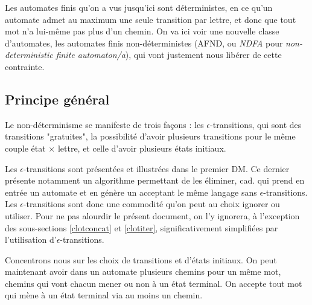 Les automates finis qu'on a vus jusqu'ici sont déterministes, en ce qu'un automate admet au maximum une seule transition par lettre, et donc que tout mot n'a lui-même pas plus d'un chemin. On va ici voir une nouvelle classe d'automates, les automates finis non-déterministes (AFND, ou \textit{NDFA} pour \textit{non-deterministic finite automaton/a}), qui vont justement nous libérer de cette contrainte.

\subsection{Principe général}
\label{introndfa}
Le non-déterminisme se manifeste de trois façons : les $\epsilon$-transitions, qui sont des transitions "gratuites", la possibilité d'avoir plusieurs transitions pour le même couple état $\times$ lettre, et celle d'avoir plusieurs états initiaux.

Les $\epsilon$-transitions sont présentées et illustrées dans le premier DM. Ce dernier présente notamment un algorithme permettant de les éliminer, cad. qui prend en entrée un automate et en génère un acceptant le même langage sans $\epsilon$-transitions. Les $\epsilon$-transitions sont donc une commodité qu'on peut au choix ignorer ou utiliser. Pour ne pas alourdir le présent document, on l'y ignorera, à l'exception des sous-sections \ref{clotconcat} et \ref{clotiter}, significativement simplifiées par l'utilisation d'$\epsilon$-transitions.

Concentrons nous sur les choix de transitions et d'états initiaux. On peut	 maintenant avoir dans un automate plusieurs chemins pour un même mot, chemins qui vont chacun mener ou non à un état terminal. On accepte tout mot qui mène à un état terminal via au moins un chemin.

